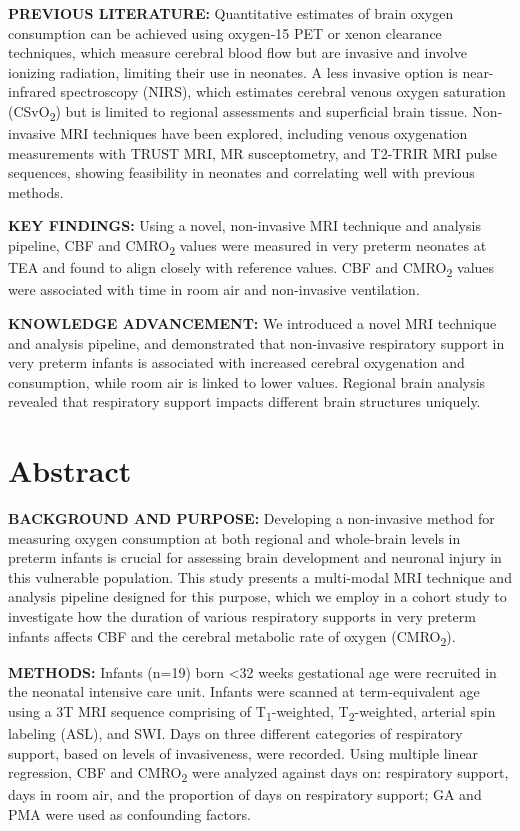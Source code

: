\documentclass[
  letterpaper,
  DIV=11,
  numbers=noendperiod]{scrartcl}
\begin{document}
\textbf{PREVIOUS LITERATURE:} Quantitative estimates of brain oxygen
consumption can be achieved using oxygen-15 PET or xenon clearance
techniques, which measure cerebral blood flow but are invasive and
involve ionizing radiation, limiting their use in neonates. A less
invasive option is near-infrared spectroscopy (NIRS), which estimates
cerebral venous oxygen saturation (CSvO\textsubscript{2}) but is limited
to regional assessments and superficial brain tissue. Non-invasive MRI
techniques have been explored, including venous oxygenation measurements
with TRUST MRI, MR susceptometry, and T2-TRIR MRI pulse sequences,
showing feasibility in neonates and correlating well with previous
methods.

\textbf{KEY FINDINGS:} Using a novel, non-invasive MRI technique and
analysis pipeline, CBF and CMRO\textsubscript{2} values were measured in
very preterm neonates at TEA and found to align closely with reference
values. CBF and CMRO\textsubscript{2} values were associated with time
in room air and non-invasive ventilation.

\textbf{KNOWLEDGE ADVANCEMENT:} We introduced a novel MRI technique and
analysis pipeline, and demonstrated that non-invasive respiratory
support in very preterm infants is associated with increased cerebral
oxygenation and consumption, while room air is linked to lower values.
Regional brain analysis revealed that respiratory support impacts
different brain structures uniquely.

\newpage{}

\section{\texorpdfstring{Abstract }{Abstract }}\label{abstract}

\textbf{BACKGROUND AND PURPOSE:} Developing a non-invasive method for
measuring oxygen consumption at both regional and whole-brain levels in
preterm infants is crucial for assessing brain development and neuronal
injury in this vulnerable population. This study presents a multi-modal
MRI technique and analysis pipeline designed for this purpose, which we
employ in a cohort study to investigate how the duration of various
respiratory supports in very preterm infants affects CBF and the
cerebral metabolic rate of oxygen (CMRO\textsubscript{2}).

\textbf{METHODS:} Infants (n=19) born \textless32 weeks gestational age
were recruited in the neonatal intensive care unit. Infants were scanned
at term-equivalent age using a 3T MRI sequence comprising of
T\textsubscript{1}-weighted, T\textsubscript{2}-weighted, arterial spin
labeling (ASL), and SWI. Days on three different categories of
respiratory support, based on levels of invasiveness, were recorded.
Using multiple linear regression, CBF and CMRO\textsubscript{2} were
analyzed against days on: respiratory support, days in room air, and the
proportion of days on respiratory support; GA and PMA were used as
confounding factors.
\end{document}
